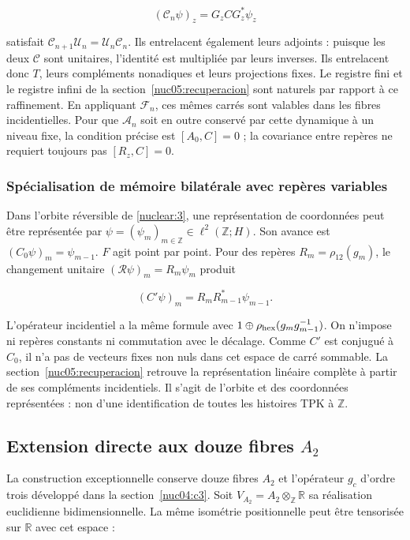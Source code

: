 \[
(\mathscr C_n\psi)_z=G_zCG_z^*\psi_z
\]

satisfait \(\mathscr C_{n+1}\mathscr U_n=\mathscr U_n\mathscr C_n\). Ils entrelacent également leurs adjoints : puisque les deux \(\mathscr C\) sont unitaires, l’identité est multipliée par leurs inverses. Ils entrelacent donc \(T\), leurs compléments nonadiques et leurs projections fixes. Le registre fini et le registre infini de la section~\ref{nuc05:recuperacion} sont naturels par rapport à ce raffinement. En appliquant \(\mathscr F_n\), ces mêmes carrés sont valables dans les fibres incidentielles. Pour que \(\mathscr A_n\) soit en outre conservé par cette dynamique à un niveau fixe, la condition précise est \([A_0,C]=0\) ; la covariance entre repères ne requiert toujours pas \([R_z,C]=0\).


\subsubsection{Spécialisation de mémoire bilatérale avec repères variables}

Dans l’orbite réversible de \cref{nuclear:3}, une représentation de coordonnées peut être représentée par \(\psi=(\psi_m)_{m\in\mathbb Z}\in\ell^2(\mathbb Z;H)\). Son avance est \((C_0\psi)_m=\psi_{m-1}\). \(F\) agit point par point. Pour des repères \(R_m=\rho_{12}(g_m)\), le changement unitaire \((\mathscr R\psi)_m=R_m\psi_m\) produit

\[
(C'\psi)_m=R_mR_{m-1}^*\psi_{m-1}.
\]

L’opérateur incidentiel a la même formule avec \(1\oplus\rho_{\rm hex}(g_mg_{m-1}^{-1})\). On n’impose ni repères constants ni commutation avec le décalage. Comme \(C'\) est conjugué à \(C_0\), il n’a pas de vecteurs fixes non nuls dans cet espace de carré sommable. La section~\ref{nuc05:recuperacion} retrouve la représentation linéaire complète à partir de ses compléments incidentiels. Il s’agit de l’orbite et des coordonnées représentées : non d’une identification de toutes les histoires TPK à \(\mathbb Z\).

\subsection{Extension directe aux douze fibres \texorpdfstring{\(A_2\)}{A2}}\label{nuc05:a2}

La construction exceptionnelle conserve douze fibres \(A_2\) et l’opérateur \(g_c\) d’ordre trois développé dans la section~\ref{nuc04:c3}. Soit \(V_{A_2}=A_2\otimes_{\mathbb Z}\mathbb R\) sa réalisation euclidienne bidimensionnelle. La même isométrie positionnelle peut être tensorisée sur \(\mathbb R\) avec cet espace :


